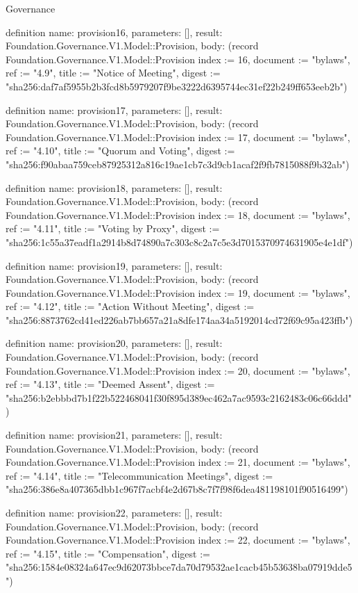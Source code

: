 \begin{lexlean}{Governance}
\begin{semanticmodule}
definition{
  name: provision16,
  parameters: [],
  result: Foundation.Governance.V1.Model::Provision,
  body: (record Foundation.Governance.V1.Model::Provision {index := 16, document := "bylaws", ref := "4.9", title := "Notice of Meeting", digest := "sha256:daf7af5955b2b3fcd8b5979207f9be3222d6395744ec31ef22b249ff653eeb2b"})
}

definition{
  name: provision17,
  parameters: [],
  result: Foundation.Governance.V1.Model::Provision,
  body: (record Foundation.Governance.V1.Model::Provision {index := 17, document := "bylaws", ref := "4.10", title := "Quorum and Voting", digest := "sha256:f90abaa759ceb87925312a816c19ae1cb7c3d9cb1acaf2f9fb7815088f9b32ab"})
}

definition{
  name: provision18,
  parameters: [],
  result: Foundation.Governance.V1.Model::Provision,
  body: (record Foundation.Governance.V1.Model::Provision {index := 18, document := "bylaws", ref := "4.11", title := "Voting by Proxy", digest := "sha256:1c55a37eadf1a2914b8d74890a7c303c8c2a7c5e3d7015370974631905e4e1df"})
}

definition{
  name: provision19,
  parameters: [],
  result: Foundation.Governance.V1.Model::Provision,
  body: (record Foundation.Governance.V1.Model::Provision {index := 19, document := "bylaws", ref := "4.12", title := "Action Without Meeting", digest := "sha256:8873762cd41ed226ab7bb657a21a8dfe174aa34a5192014cd72f69c95a423ffb"})
}

definition{
  name: provision20,
  parameters: [],
  result: Foundation.Governance.V1.Model::Provision,
  body: (record Foundation.Governance.V1.Model::Provision {index := 20, document := "bylaws", ref := "4.13", title := "Deemed Assent", digest := "sha256:b2ebbbd7b1f22b522468041f30f895d389ec462a7ac9593c2162483c06c66ddd"})
}

definition{
  name: provision21,
  parameters: [],
  result: Foundation.Governance.V1.Model::Provision,
  body: (record Foundation.Governance.V1.Model::Provision {index := 21, document := "bylaws", ref := "4.14", title := "Telecommunication Meetings", digest := "sha256:386e8a407365dbb1c967f7acbf4e2d67b8c7f7f98f6dea481198101f90516499"})
}

definition{
  name: provision22,
  parameters: [],
  result: Foundation.Governance.V1.Model::Provision,
  body: (record Foundation.Governance.V1.Model::Provision {index := 22, document := "bylaws", ref := "4.15", title := "Compensation", digest := "sha256:1584e08324a647ec9d62073bbce7da70d79532ae1cacb45b53638ba07919dde5"})
}


\end{semanticmodule}
\end{lexlean}
